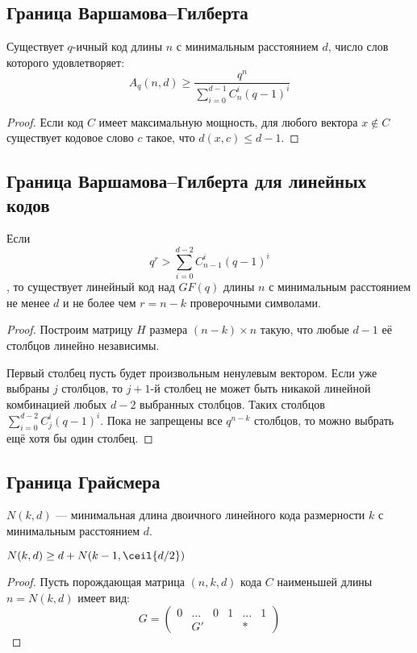\subsection{Граница Варшамова--Гилберта}

\begin{theorem}
    Существует \(q\)-ичный код длины \(n\) с минимальным расстоянием \(d\), число слов которого удовлетворяет:
    \[A_q(n, d) \geq \frac{q^n}{\sum_{i=0}^{d - 1} C_n^i (q - 1)^i}\]
\end{theorem}
\begin{proof}
    Если код \(C\) имеет максимальную мощность, для любого вектора \(x \notin C\)
    существует кодовое слово \(c\) такое, что \(d(x, c) \leq d - 1\).
    \unfinished
\end{proof}

\subsection{Граница Варшамова--Гилберта для линейных кодов}

\begin{theorem}
    Если
    \[q^r > \sum_{i=0}^{d - 2} C_{n - 1}^i (q - 1)^i\]
    , то существует линейный код над \(GF(q)\) длины \(n\)
    с минимальным расстоянием не менее \(d\) и не более чем \(r = n - k\)
    проверочными символами.
\end{theorem}
\begin{proof}
    Построим матрицу \(H\) размера \((n - k) \times n\) такую, что
    любые \(d - 1\) её столбцов линейно независимы.

    Первый столбец пусть будет произвольным ненулевым вектором.
    Если уже выбраны \(j\) столбцов, то \(j + 1\)-й столбец не может быть
    никакой линейной комбинацией любых \(d - 2\) выбранных столбцов.
    Таких столбцов \(\sum_{i=0}^{d-2} C_j^i (q - 1)^i\).
    Пока не запрещены все \(q^{n - k}\) столбцов, то можно выбрать ещё хотя бы один столбец.
\end{proof}

\unfinished

\subsection{Граница Грайсмера}

\begin{notation}
    \(N(k, d)\) --- минимальная длина двоичного линейного кода размерности
    \(k\) с минимальным расстоянием \(d\).
\end{notation}

\begin{theorem}
    \(N(k, d) \geq d + N(k - 1, \ceil{d / 2})\)
\end{theorem}
\begin{proof}
    Пусть порождающая матрица \((n, k, d)\) кода \(C\) наименьшей длины \(n = N(k, d)\) имеет вид:
    \[G = \begin{pmatrix}
            0 & \dots & 0 & 1 & \dots & 1 \\
              & G'    &   &   & *
        \end{pmatrix}\]
        \unfinished
\end{proof}